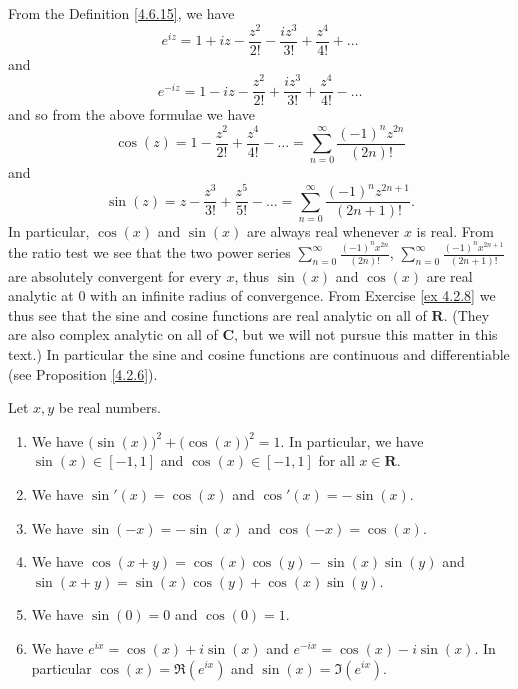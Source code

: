 \begin{additional corollary}\label{ac 4.7.1}
From the Definition \ref{4.6.15}, we have
\[
    e^{i z} = 1 + i z - \frac{z^2}{2!} - \frac{i z^3}{3!} + \frac{z^4}{4!} + \dots
\]
and
\[
    e^{- i z} = 1 - i z - \frac{z^2}{2!} + \frac{i z^3}{3!} + \frac{z^4}{4!} - \dots
\]
and so from the above formulae we have
\[
    \cos(z) = 1 - \frac{z^2}{2!} + \frac{z^4}{4!} - \dots = \sum_{n = 0}^\infty \frac{(-1)^n z^{2n}}{(2n)!}
\]
and
\[
    \sin(z) = z - \frac{z^3}{3!} + \frac{z^5}{5!} - \dots = \sum_{n = 0}^\infty \frac{(-1)^n z^{2n + 1}}{(2n + 1)!}.
\]
In particular, \(\cos(x)\) and \(\sin(x)\) are always real whenever \(x\) is real.
From the ratio test we see that the two power series \(\sum_{n = 0}^\infty \frac{(-1)^n x^{2n}}{(2n)!}\), \(\sum_{n = 0}^\infty \frac{(-1)^n x^{2n + 1}}{(2n + 1)!}\) are absolutely convergent for every \(x\), thus \(\sin(x)\) and \(\cos(x)\) are real analytic at \(0\) with an infinite radius of convergence.
From Exercise \ref{ex 4.2.8} we thus see that the sine and cosine functions are real analytic on all of \(\mathbf{R}\).
(They are also complex analytic on all of \(\mathbf{C}\), but we will not pursue this matter in this text.)
In particular the sine and cosine functions are continuous and differentiable (see Proposition \ref{4.2.6}).
\end{additional corollary}

\begin{theorem}\label{4.7.2}
    Let \(x, y\) be real numbers.
    \begin{enumerate}
        \item We have \(\big(\sin(x)\big)^2 + \big(\cos(x)\big)^2 = 1\).
              In particular, we have \(\sin(x) \in [-1, 1]\) and \(\cos(x) \in [-1, 1]\) for all \(x \in \mathbf{R}\).
        \item We have \(\sin'(x) = \cos(x)\) and \(\cos'(x) = -\sin(x)\).
        \item We have \(\sin(-x) = -\sin(x)\) and \(\cos(-x) = \cos(x)\).
        \item We have \(\cos(x + y) = \cos(x) \cos(y) - \sin(x) \sin(y)\) and \(\sin(x + y) = \sin(x) \cos(y) + \cos(x) \sin(y)\).
        \item We have \(\sin(0) = 0\) and \(\cos(0) = 1\).
        \item We have \(e^{i x} = \cos(x) + i \sin(x)\) and \(e^{- i x} = \cos(x) - i \sin(x)\).
              In particular \(\cos(x) = \Re(e^{i x})\) and \(\sin(x) = \Im(e^{i x})\).
    \end{enumerate}
\end{theorem}

